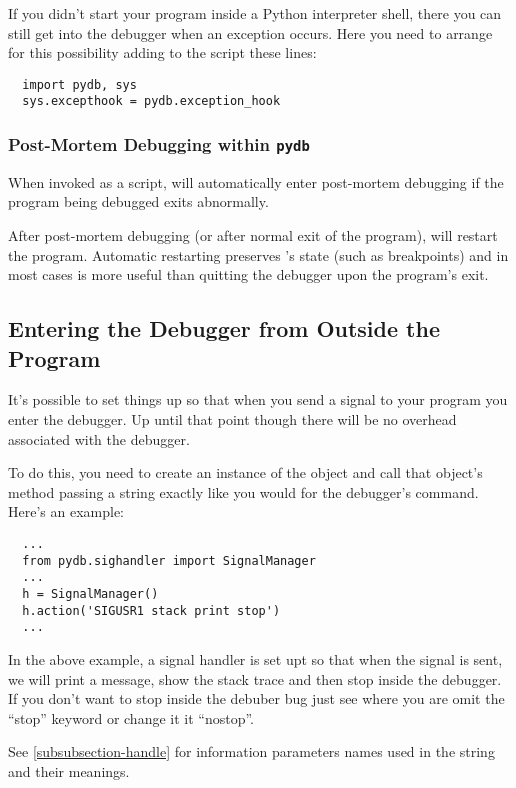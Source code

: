 If you didn't start your program inside a Python interpreter shell,
there you can still get into the debugger when an exception
occurs. Here you need to arrange for this possibility adding to the
script these lines:

\begin{verbatim}
  import pydb, sys
  sys.excepthook = pydb.exception_hook
\end{verbatim}

\subsubsection{Post-Mortem Debugging within {\tt pydb}}
When invoked as a script,  will automatically enter
post-mortem debugging if the program being debugged exits
abnormally. 

After post-mortem debugging (or after normal exit of the
program),  will restart the program.  Automatic restarting
preserves 's state (such as breakpoints) and in most cases
is more useful than quitting the debugger upon the program's exit.

\subsection{Entering the Debugger from Outside the Program}
It's possible to set things up so that when you send a signal to your
program you enter the debugger. Up until that point though there will
be no overhead associated with the debugger.

To do this, you need to create an instance of the
 object and call that object's 
method passing a string exactly like you would for the 
debugger's  command. Here's an example:

\begin{verbatim}
  ...
  from pydb.sighandler import SignalManager
  ...
  h = SignalManager()
  h.action('SIGUSR1 stack print stop')
  ...

\end{verbatim}

In the above example, a signal handler is set upt so that when the
 signal is sent, we will print a message, show the stack
trace and then stop inside the debugger. If you don't want to stop
inside the debuber bug just see where you are omit the ``stop''
keyword or change it it ``nostop''.

See \ref{subsubsection-handle} for information parameters names used
in the string and their meanings.

